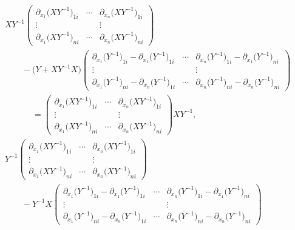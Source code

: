 \documentclass[pdftex]{sigma}
\numberwithin{equation}{section}
\begin{document}
\begin{align}
& XY^{-1}
\begin{pmatrix}
\partial_{x_1}\bigl(XY^{-1}\bigr)_{1i} & \cdots & \partial_{x_n}\bigl(XY^{-1}\bigr)_{1i} \\
\vdots & & \vdots \\
\partial_{x_1}\bigl(XY^{-1}\bigr)_{ni} & \cdots & \partial_{x_n}\bigl(XY^{-1}\bigr)_{ni}
\end{pmatrix} \nonumber \\
&\qquad-\bigl(Y+XY^{-1}X\bigr)
\begin{pmatrix}
\partial_{x_1}\bigl(Y^{-1}\bigr)_{1i}-\partial_{x_1}\bigl(Y^{-1}\bigr)_{1i} & \cdots & \partial_{x_n}\bigl(Y^{-1}\bigr)_{1i}-\partial_{x_1}\bigl(Y^{-1}\bigr)_{ni} \\
\vdots & & \vdots \\
\partial_{x_1}\bigl(Y^{-1}\bigr)_{ni}-\partial_{x_n}\bigl(Y^{-1}\bigr)_{1i} & \cdots & \partial_{x_n}\bigl(Y^{-1}\bigr)_{ni}-\partial_{x_n}\bigl(Y^{-1}\bigr)_{ni}
\end{pmatrix}\nonumber \\
&\phantom{\qquad-}{}=
\begin{pmatrix}
\partial_{x_1}\bigl(XY^{-1}\bigr)_{1i} & \cdots & \partial_{x_n}\bigl(XY^{-1}\bigr)_{1i} \\
\vdots & & \vdots \\
\partial_{x_1}\bigl(XY^{-1}\bigr)_{ni} & \cdots & \partial_{x_n}\bigl(XY^{-1}\bigr)_{ni}
\end{pmatrix}XY^{-1},\label{K1}
\\
& Y^{-1}
\begin{pmatrix}
\partial_{x_1}\bigl(XY^{-1}\bigr)_{1i} & \cdots & \partial_{x_n}\bigl(XY^{-1}\bigr)_{1i} \\
\vdots & & \vdots \\
\partial_{x_1}\bigl(XY^{-1}\bigr)_{ni} & \cdots & \partial_{x_n}\bigl(XY^{-1}\bigr)_{ni}
\end{pmatrix}\nonumber \\
&\qquad-Y^{-1}X
\begin{pmatrix}
\partial_{x_1}\bigl(Y^{-1}\bigr)_{1i}-\partial_{x_1}\bigl(Y^{-1}\bigr)_{1i} & \cdots & \partial_{x_n}\bigl(Y^{-1}\bigr)_{1i}-\partial_{x_1}\bigl(Y^{-1}\bigr)_{ni} \\
\vdots & & \vdots \\
\partial_{x_1}\bigl(Y^{-1}\bigr)_{ni}-\partial_{x_n}\bigl(Y^{-1}\bigr)_{1i} & \cdots & \partial_{x_n}\bigl(Y^{-1}\bigr)_{ni}-\partial_{x_n}\bigl(Y^{-1}\bigr)_{ni}
\end{pmatrix}\nonumber \\

\end{align}
\end{document}
